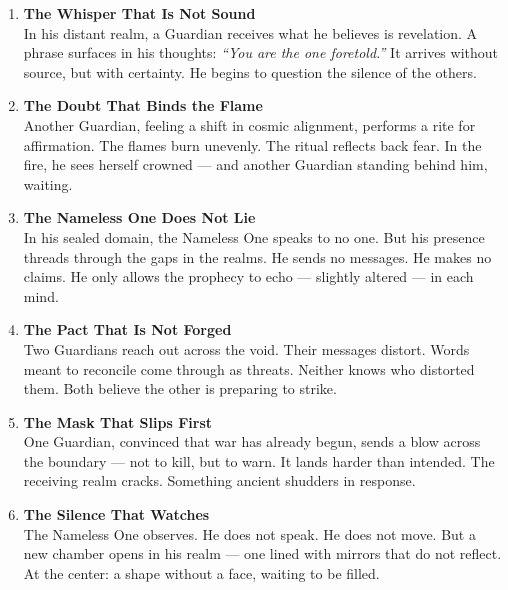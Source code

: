 \documentclass[9pt]{article}
\begin{document}
\begin{enumerate}
    \item \textbf{The Whisper That Is Not Sound} \\
    In his distant realm, a Guardian receives what he believes is revelation. A phrase surfaces in his thoughts: \emph{“You are the one foretold.”} It arrives without source, but with certainty. He begins to question the silence of the others.

    \vspace{1em}
    \item \textbf{The Doubt That Binds the Flame} \\
    Another Guardian, feeling a shift in cosmic alignment, performs a rite for affirmation. The flames burn unevenly. The ritual reflects back fear. In the fire, he sees herself crowned — and another Guardian standing behind him, waiting.

    \vspace{1em}
    \item \textbf{The Nameless One Does Not Lie} \\
    In his sealed domain, the Nameless One speaks to no one. But his presence threads through the gaps in the realms. He sends no messages. He makes no claims. He only allows the prophecy to echo — slightly altered — in each mind.

    \vspace{1em}
    \item \textbf{The Pact That Is Not Forged} \\
    Two Guardians reach out across the void. Their messages distort. Words meant to reconcile come through as threats. Neither knows who distorted them. Both believe the other is preparing to strike.

    \vspace{1em}
    \item \textbf{The Mask That Slips First} \\
    One Guardian, convinced that war has already begun, sends a blow across the boundary — not to kill, but to warn. It lands harder than intended. The receiving realm cracks. Something ancient shudders in response.

    \vspace{1em}
    \item \textbf{The Silence That Watches} \\
    The Nameless One observes. He does not speak. He does not move. But a new chamber opens in his realm — one lined with mirrors that do not reflect. At the center: a shape without a face, waiting to be filled.

\end{enumerate}
\end{document}
